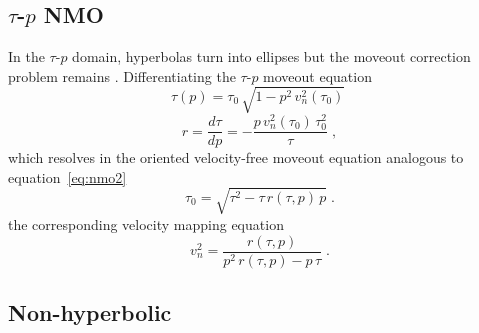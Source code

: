 \subsection{$\tau$-$p$ NMO}

  In
  the $\tau$-$p$ domain, hyperbolas turn into ellipses but the moveout
  correction problem remains
  \cite[]{GEO46-03-02550267}. Differentiating the $\tau$-$p$ moveout
  equation
\begin{equation}
  \label{eq:taup}
  \tau(p) = \tau_0\,\sqrt{1 - p^2\,v_n^2(\tau_0)}\;
\end{equation}
 
\begin{equation}
  r = {\frac{d \tau}{d p}} = - {\frac{p\,v_n^2(\tau_0)\,\tau_0^2}{\tau}}\;,
  \label{eq:dtaup}
\end{equation}
which resolves in the oriented velocity-free moveout equation analogous to
equation~\ref{eq:nmo2}
\begin{equation}
  \label{eq:taupmo}
  \tau_0 = \sqrt{\tau^2 - \tau\,r(\tau,p)\,p}\;.
\end{equation}
 the
corresponding velocity mapping equation 
\begin{equation}
  \label{eq:taupvel}
  v_n^2 = \frac{r(\tau,p)}{p^2\,r(\tau,p) - p\,\tau}\;.
\end{equation}

\subsection{Non-hyperbolic  }

\nocite{Sword.sep.51.313}

